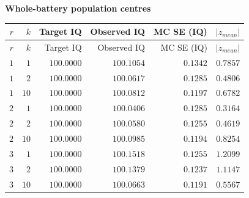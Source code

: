 
\begingroup\small
\setlength{\tabcolsep}{4pt}
\noindent\textbf{Whole-battery population centres}
\begin{longtable}{rrrrrr}
\toprule
$r$ & $k$ & Target IQ & Observed IQ & MC SE (IQ) & $|z_{mean}|$ \\
\midrule
\endfirsthead
$r$ & $k$ & Target IQ & Observed IQ & MC SE (IQ) & $|z_{mean}|$ \\
\midrule
\endhead
\bottomrule
\endfoot
$1$ & $1$ & $100.0000$ & $100.1054$ & $0.1342$ & $0.7857$ \\
$1$ & $2$ & $100.0000$ & $100.0617$ & $0.1285$ & $0.4806$ \\
$1$ & $10$ & $100.0000$ & $100.0812$ & $0.1197$ & $0.6782$ \\
$2$ & $1$ & $100.0000$ & $100.0406$ & $0.1285$ & $0.3164$ \\
$2$ & $2$ & $100.0000$ & $100.0580$ & $0.1255$ & $0.4619$ \\
$2$ & $10$ & $100.0000$ & $100.0985$ & $0.1194$ & $0.8254$ \\
$3$ & $1$ & $100.0000$ & $100.1518$ & $0.1255$ & $1.2099$ \\
$3$ & $2$ & $100.0000$ & $100.1379$ & $0.1237$ & $1.1147$ \\
$3$ & $10$ & $100.0000$ & $100.0663$ & $0.1191$ & $0.5567$ \\
\end{longtable}
\endgroup

